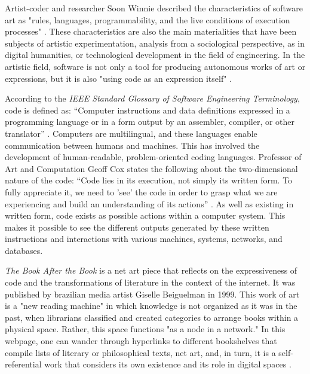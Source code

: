 \documentclass[12pt, twoside, a4paper]{report}
\begin{document}
Artist-coder and researcher Soon Winnie described the characteristics of 
software art as "rules, languages, programmability, and the live conditions of execution processes" \citep{soon2018executing}. 
These characteristics are also the main materialities that have been subjects of artistic experimentation, analysis from a sociological perspective, as in digital humanities, or technological development in the field of engineering. In the artistic field, software is not only a tool for producing autonomous works of art or expressions, but it is also "using code as an expression itself" \citep{andersen2004software}.


According to the \textit{IEEE Standard Glossary of Software Engineering Terminology}, code is defined as: “Computer instructions and data definitions expressed in a programming language or in a form output by an assembler, compiler, or other translator” \citep{ieee1983ieee}. Computers are multilingual, and these languages enable communication between humans and machines. This has involved the development of human-readable, problem-oriented coding languages. Professor of Art and Computation Geoff Cox states the following about the two-dimensional nature of the code: “Code lies in its execution, not simply its written form. To fully appreciate it, we need to 'see' the code in order to grasp what we are experiencing and build an understanding of its actions” \citep{cox2001aesthetics}. As well as existing in written form, code exists as possible actions within a computer system. This makes it possible to see the different outputs generated by these written instructions and interactions with various machines, systems, networks, and databases.

\textit{The Book After the Book} is a net art piece that reflects on the expressiveness of code and
 the transformations of literature in the context of the internet. It was published by brazilian media artist Giselle Beiguelman in 1999.  This work of art is a "new reading machine" in which knowledge is not 
 organized as it was in the past, when librarians classified and created categories to arrange books within a 
 physical space. Rather, this space functions "as a node in a network." In this webpage, one can wander through
  hyperlinks to different bookshelves that compile lists of literary or philosophical texts, net art, and, 
  in turn, it is a self-referential work that considers its own existence and its role in digital spaces \citep{oliver2019digital}.
  
\end{document}
